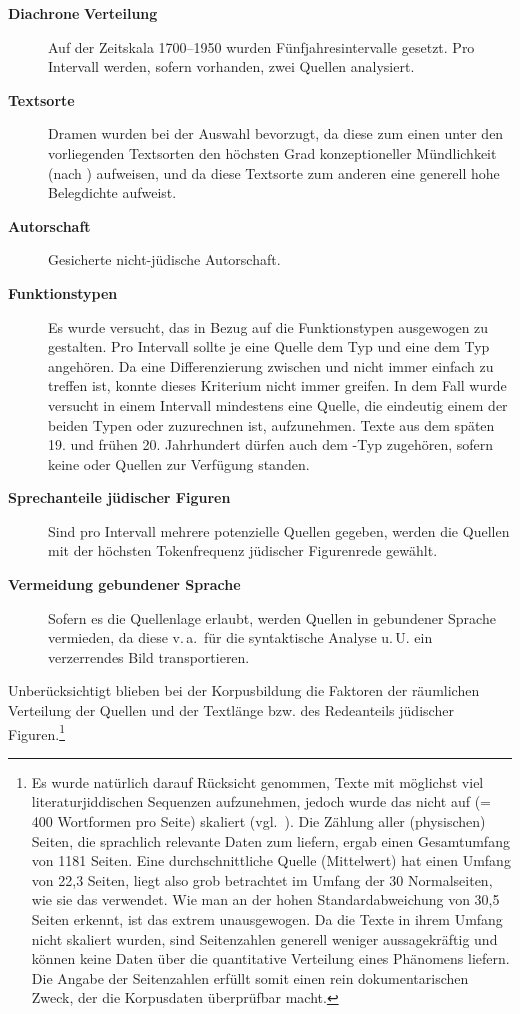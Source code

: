  \begin{description}  
\item[\textbf{Diachrone} \textbf{Verteilung}] 
Auf der Zeitskala 1700–1950 wurden Fünfjahresintervalle gesetzt. Pro Intervall werden, sofern vorhanden, zwei Quellen analysiert.
\item [\textbf{Textsorte}] Dramen wurden bei der Auswahl bevorzugt, da diese zum einen unter den vorliegenden Textsorten den höchsten Grad konzeptioneller Mündlichkeit (nach \citealt{KochOesterreicher1985}) aufweisen, und da diese Textsorte zum anderen eine generell hohe Belegdichte aufweist. %
\item [\textbf{Autorschaft}] Gesicherte nicht-jüdische Autorschaft.
\item [\textbf{Funktionstypen}] Es wurde versucht, das  in Bezug auf die Funktionstypen ausgewogen zu gestalten. Pro Intervall sollte je eine Quelle dem Typ  und eine dem Typ  angehören. Da eine Differenzierung zwischen  und  nicht immer einfach zu treffen ist, konnte dieses Kriterium nicht immer greifen. In dem Fall wurde versucht in einem Intervall mindestens eine Quelle, die eindeutig einem der beiden Typen  oder  zuzurechnen ist, aufzunehmen. Texte aus dem späten 19. und frühen 20. Jahrhundert dürfen auch dem -Typ zugehören, sofern keine  oder  Quellen zur Verfügung standen. 
\item [\textbf{Sprechanteile jüdischer Figuren}] Sind pro Intervall mehrere potenzielle Quellen gegeben, werden die Quellen mit der höchsten Tokenfrequenz jüdischer Figurenrede gewählt.
\item[\textbf{Vermeidung gebundener Sprache}] Sofern es die Quellenlage erlaubt, werden Quellen in gebundener Sprache vermieden, da diese v.\,a.\, für die syntaktische Analyse u.\,U. ein verzerrendes Bild transportieren. 
\end{description}

Unberücksichtigt blieben bei der Korpusbildung die Faktoren der räumlichen Verteilung der Quellen und der Textlänge bzw. des Redeanteils jüdischer Figuren.\footnote{\label{FNSeitenzahlliji}Es wurde natürlich darauf Rücksicht genommen, Texte mit möglichst viel literaturjiddischen Sequenzen aufzunehmen, jedoch wurde das  nicht auf  (= 400 Wortformen pro Seite) skaliert (vgl.\,  ). Die Zählung aller (physischen) \,%
 Seiten, die sprachlich relevante Daten zum  liefern, ergab einen Gesamtumfang von 1181 Seiten. Eine durchschnittliche Quelle (Mittelwert) hat einen Umfang von 22,3 Seiten, liegt also grob betrachtet im Umfang der 30 Normalseiten, wie sie das  verwendet. Wie man an der hohen Standardabweichung von 30,5 Seiten erkennt, ist das  extrem unausgewogen. Da die Texte in ihrem Umfang nicht skaliert wurden, sind Seitenzahlen generell weniger aussagekräftig und können keine Daten über die quantitative Verteilung eines Phänomens liefern. Die Angabe der Seitenzahlen erfüllt somit einen rein dokumentarischen Zweck, der die Korpusdaten überprüfbar macht.}  

